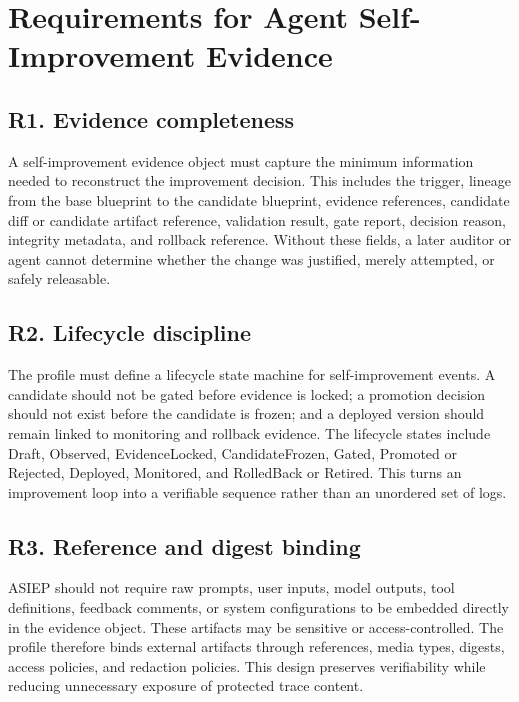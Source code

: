 \section{Requirements for Agent Self-Improvement Evidence}

\subsection{R1. Evidence completeness}

A self-improvement evidence object must capture the minimum information needed to reconstruct the improvement decision. This includes the trigger, lineage from the base blueprint to the candidate blueprint, evidence references, candidate diff or candidate artifact reference, validation result, gate report, decision reason, integrity metadata, and rollback reference. Without these fields, a later auditor or agent cannot determine whether the change was justified, merely attempted, or safely releasable.

\subsection{R2. Lifecycle discipline}

The profile must define a lifecycle state machine for self-improvement events. A candidate should not be gated before evidence is locked; a promotion decision should not exist before the candidate is frozen; and a deployed version should remain linked to monitoring and rollback evidence. The lifecycle states include Draft, Observed, EvidenceLocked, CandidateFrozen, Gated, Promoted or Rejected, Deployed, Monitored, and RolledBack or Retired. This turns an improvement loop into a verifiable sequence rather than an unordered set of logs.

\subsection{R3. Reference and digest binding}

ASIEP should not require raw prompts, user inputs, model outputs, tool definitions, feedback comments, or system configurations to be embedded directly in the evidence object. These artifacts may be sensitive or access-controlled. The profile therefore binds external artifacts through references, media types, digests, access policies, and redaction policies. This design preserves verifiability while reducing unnecessary exposure of protected trace content.

